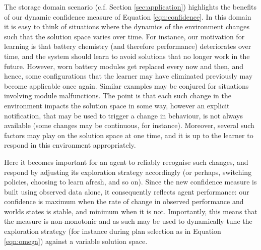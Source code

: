 The storage domain scenario (c.f. Section \ref{sec:application}) highlights the benefits of our dynamic confidence measure of Equation \ref{eqn:confidence}. In this domain it is easy to think of situations where the dynamics of the environment changes such that the solution space varies over time. For instance, our motivation for learning is that battery chemistry (and therefore performance) deteriorates over time, and the system should learn to avoid solutions that no longer work in the future. However, worn battery modules get replaced every now and then, and hence, some configurations that the learner may have eliminated previously may become applicable once again. Similar examples may be conjured for situations involving module malfunctions. The point is that each such change in the environment impacts the solution space in some way, however an explicit notification, that may be used to trigger a change in behaviour, is not always available (some changes may be continuous, for instance). Moreover, several such factors may play on the solution space at one time, and it is up to the learner to respond in this environment appropriately.


Here it becomes important for an agent to reliably recognise such changes, and respond by adjusting its exploration strategy accordingly (or perhaps, switching policies, choosing to learn afresh, and so on). Since the new confidence measure is built using observed data alone, it consequently reflects agent performance: our confidence is maximum when the rate of change in observed performance and worlds states is stable, and minimum when it is not. Importantly, this means that the measure is non-monotonic and as such may be used to dynamically tune the exploration strategy (for instance during plan selection as in Equation \ref{eqn:omega}) against a variable solution space.
